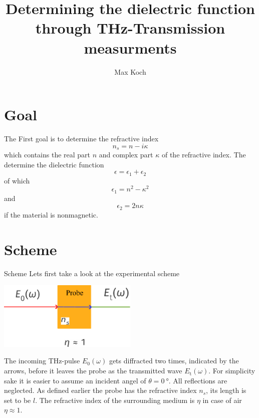 \documentclass[aspectratio=1610, 9pt]{beamer}
\title{Determining the dielectric function through THz-Transmission measurments}
\author[M.~Koch]{Max Koch}
\institute[AG Wang]{Arbeitsgruppe Wang \\  Fakultät Physik}
\begin{document}
\maketitle

\section{Goal}
\begin{frame}
The First goal is to determine the refractive index 
\begin{equation}
  n_s = n - i\kappa
\end{equation}
which contains the real part $n$ and complex part $\kappa$ of the refractive index.
The determine the dielectric function 
\begin{equation}
  \epsilon = \epsilon_1 + \epsilon_2
\end{equation}
of which
\begin{equation}
  \epsilon_1 = n^2 - \kappa^2
\end{equation}
and 
\begin{equation}
  \epsilon_2  = 2n\kappa 
\end{equation}
if the material is nonmagnetic.
\end{frame}

\section{Scheme}
\begin{frame}{Scheme}
  Lets first take a look at the experimental scheme
  \begin{center}
  \includegraphics[width=0.5\textwidth]{images/Transmission.pdf}
  \end{center}
  The incoming THz-pulse $E_0(\omega)$ gets diffracted two times, indicated by the arrows, before it leaves the probe as the transmitted wave $E_\text{t}(\omega)$.
  For simplicity sake it is easier to assume an incident angel of $\theta=\SI{0}{\degree}$.
  All reflections are neglected.
  As defined earlier the probe has the refractive index $n_s$, its length is set to be $l$.
  The refractive index of the surrounding medium is $\eta$ in case of air $\eta\approx 1$.
\end{frame}
\end{document}
